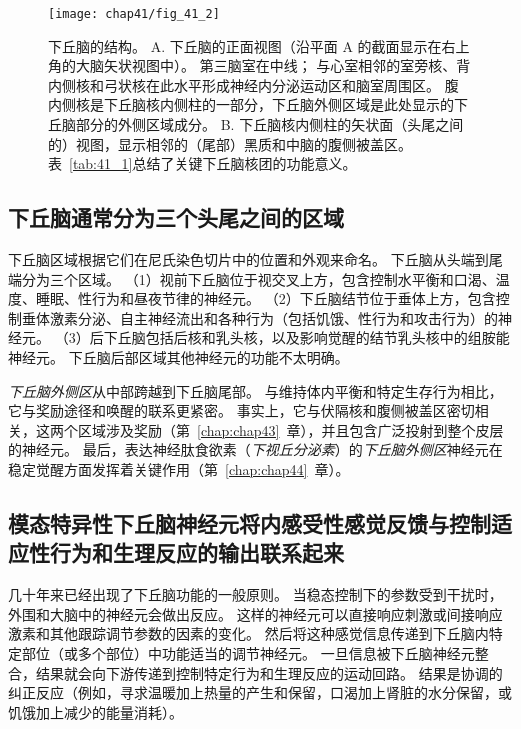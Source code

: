 \begin{figure}[htbp]
	\centering
	\texttt{[image: chap41/fig\_41\_2]}
	\caption{下丘脑的结构。
		A. 下丘脑的正面视图（沿平面 A 的截面显示在右上角的大脑矢状视图中）。
		第三脑室在中线；
		与心室相邻的室旁核、背内侧核和弓状核在此水平形成神经内分泌运动区和脑室周围区。
		腹内侧核是下丘脑核内侧柱的一部分，下丘脑外侧区域是此处显示的下丘脑部分的外侧区域成分。 
		B. 下丘脑核内侧柱的矢状面（头尾之间的）视图，显示相邻的（尾部）黑质和中脑的腹侧被盖区。
		表~\ref{tab:41_1}总结了关键下丘脑核团的功能意义。}
	\label{fig:41_2}
\end{figure}



\subsection{下丘脑通常分为三个头尾之间的区域}

下丘脑区域根据它们在尼氏染色切片中的位置和外观来命名。
下丘脑从头端到尾端分为三个区域。
（1）视前下丘脑位于视交叉上方，包含控制水平衡和口渴、温度、睡眠、性行为和昼夜节律的神经元。
（2）下丘脑结节位于垂体上方，包含控制垂体激素分泌、自主神经流出和各种行为（包括饥饿、性行为和攻击行为）的神经元。
（3）后下丘脑包括后核和乳头核，以及影响觉醒的结节乳头核中的组胺能神经元。
下丘脑后部区域其他神经元的功能不太明确。


\textit{下丘脑外侧区}从中部跨越到下丘脑尾部。
与维持体内平衡和特定生存行为相比，它与奖励途径和唤醒的联系更紧密。
事实上，它与伏隔核和腹侧被盖区密切相关，这两个区域涉及奖励（第~\ref{chap:chap43}~章），并且包含广泛投射到整个皮层的神经元。
最后，表达神经肽食欲素（\textit{下视丘分泌素}）的\textit{下丘脑外侧区}神经元在稳定觉醒方面发挥着关键作用（第~\ref{chap:chap44}~章）。



\subsection{模态特异性下丘脑神经元将内感受性感觉反馈与控制适应性行为和生理反应的输出联系起来}

几十年来已经出现了下丘脑功能的一般原则。
当稳态控制下的参数受到干扰时，外围和大脑中的神经元会做出反应。
这样的神经元可以直接响应刺激或间接响应激素和其他跟踪调节参数的因素的变化。
然后将这种感觉信息传递到下丘脑内特定部位（或多个部位）中功能适当的调节神经元。
一旦信息被下丘脑神经元整合，结果就会向下游传递到控制特定行为和生理反应的运动回路。
结果是协调的纠正反应（例如，寻求温暖加上热量的产生和保留，口渴加上肾脏的水分保留，或饥饿加上减少的能量消耗）。


